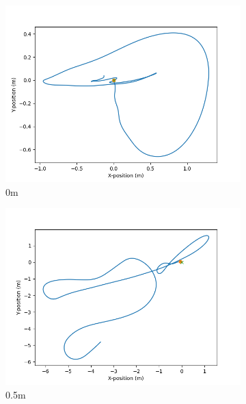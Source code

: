 \documentclass[class=article, crop=false]{standalone}
\begin{document}
\begin{figure}
    \centering
    \begin{subfigure}[b]{0.48\textwidth}
        \centering
        \includegraphics{scenario1/rov-100m/0.0m/usv_position_controlled}
        \caption{0m}
        \label{}
    \end{subfigure}
    \hfill
    \begin{subfigure}[b]{0.48\textwidth}
        \centering
        \includegraphics{scenario1/rov-100m/0.5m/usv_position_controlled}
        \caption{0.5m}
        \label{}
    \end{subfigure}
    \vfill
    \begin{subfigure}[b]{0.48\textwidth}
        \centering

\end{subfigure}
\end{figure}
\end{document}
